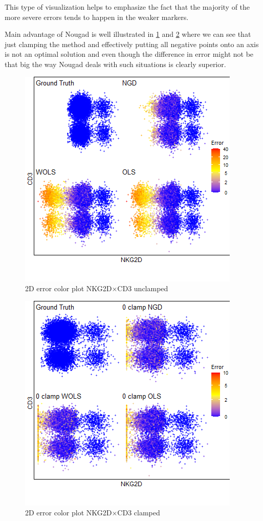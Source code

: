 This type of visualization helps to emphasize the fact that the majority of the more severe errors tends to happen in the weaker markers.

Main advantage of Nougad is well illustrated in \cref{fig:blob_noclp} and \cref{fig:blob_clp} where we can see that just clamping the method and effectively putting all negative points onto an axis is not an optimal solution and even though the difference in error might not be that big the way Nougad deals with such situations is clearly superior. 

\begin{figure}
  \includegraphics[width=0.7\linewidth]{img/blobs_noclp.png}
  \caption{2D error color plot NKG2D$\times$CD3 unclamped}
  \label{fig:blob_noclp}
\end{figure}

\begin{figure}
  \includegraphics[width=0.7\linewidth]{img/blobs_clp.png}
  \caption{2D error color plot NKG2D$\times$CD3 clamped}
  \label{fig:blob_clp}
\end{figure}

